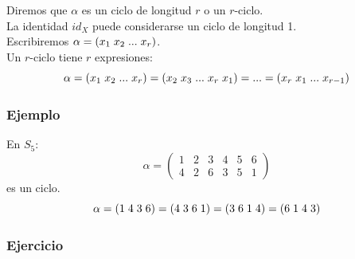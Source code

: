 \documentclass[11pt,a4paper]{article}
\begin{document}
Diremos que $\alpha$ es un ciclo de longitud $r$ o un $r$-ciclo. \\
La identidad $id_{X}$ puede considerarse un ciclo de longitud 1. \\
Escribiremos $\alpha = (x_{1} \hspace{0.1cm} x_{2} \hspace{0.1cm} ... \hspace{0.1cm} x_{r})$. \\
Un $r$-ciclo tiene $r$ expresiones:
$$\alpha = (x_{1} \hspace{0.1cm} x_{2} \hspace{0.1cm} ... \hspace{0.1cm} x_{r}) = (x_{2} \hspace{0.1cm} x_{3} \hspace{0.1cm} ... \hspace{0.1cm} x_{r} \hspace{0.1cm} x_{1}) = ... = (x_{r} \hspace{0.1cm} x_{1} \hspace{0.1cm} ... \hspace{0.1cm} x_{r-1})$$

\subsubsection*{Ejemplo}

En $S_{5}$:
\begin{equation*}
\alpha = 
\begin{pmatrix}
1 & 2 & 3 & 4 & 5 & 6 \\
4 & 2 & 6 & 3 & 5 & 1
\end{pmatrix}
\end{equation*}
es un ciclo.
$$\alpha = (1 \hspace{0.1cm} 4 \hspace{0.1cm} 3 \hspace{0.1cm} 6) = (4 \hspace{0.1cm} 3 \hspace{0.1cm} 6 \hspace{0.1cm} 1) = (3 \hspace{0.1cm} 6 \hspace{0.1cm} 1 \hspace{0.1cm} 4) = (6 \hspace{0.1cm} 1 \hspace{0.1cm} 4 \hspace{0.1cm} 3)$$


\subsubsection*{Ejercicio}
\end{document}
